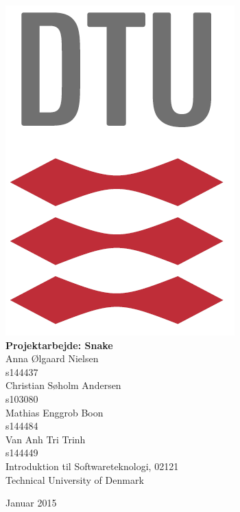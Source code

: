 \begin{center}

\vspace*{-30mm} \noindent
\hfill \includegraphics[height=15 mm]{pics/DTULogo.png} \\[30mm]

{\Huge \bf Projektarbejde: Snake %
}\\[45mm]

{\Large Anna Ølgaard Nielsen} \\  s144437 \\[10mm]
{\Large Christian Søholm Andersen} \\  s103080 \\[10mm]
{\Large Mathias Enggrob Boon} \\  s144484 \\[10mm]
{\Large Van Anh Tri Trinh } \\  s144449 \\[40mm]


Introduktion til Softwareteknologi,  02121\\              
Technical University of Denmark\\[4mm]                    
\centerline{\large Januar 2015}                         

\end{center}
\thispagestyle{empty}
\newpage
